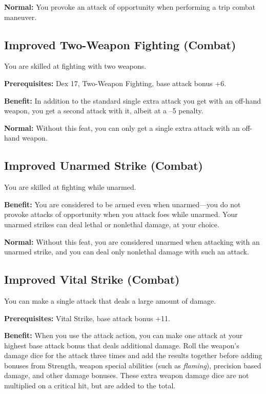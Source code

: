 \textbf{Normal:} You provoke an attack of opportunity when performing a trip combat maneuver.
				
\subsection{Improved Two-Weapon Fighting (Combat)}

				
You are skilled at fighting with two weapons.
				
\textbf{Prerequisites:} Dex 17, Two-Weapon Fighting, base attack bonus +6.
				
\textbf{Benefit:} In addition to the standard single extra attack you get with an off-hand weapon, you get a second attack with it, albeit at a --5 penalty.
				
\textbf{Normal:} Without this feat, you can only get a single extra attack with an off-hand weapon.
				
\subsection{Improved Unarmed Strike (Combat)}

				
You are skilled at fighting while unarmed.
				
\textbf{Benefit:} You are considered to be armed even when unarmed---you do not provoke attacks of opportunity when you attack foes while unarmed. Your unarmed strikes can deal lethal or nonlethal damage, at your choice.
				
\textbf{Normal:} Without this feat, you are considered unarmed when attacking with an unarmed strike, and you can deal only nonlethal damage with such an attack.
				
\subsection{Improved Vital Strike (Combat)}

				
You can make a single attack that deals a large amount of damage.
				
\textbf{Prerequisites:} Vital Strike, base attack bonus +11.
				
\textbf{Benefit:} When you use the attack action, you can make one attack at your highest base attack bonus that deals additional damage. Roll the weapon's damage dice for the attack three times and add the results together before adding bonuses from Strength, weapon special abilities (such as \textit{flaming}), precision based damage, and other damage bonuses. These extra weapon damage dice are not multiplied on a critical hit, but are added to the total.
				

